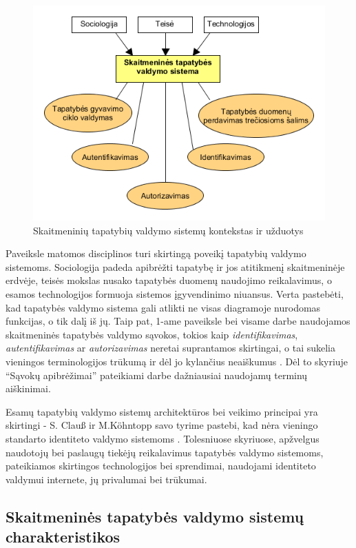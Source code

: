 \begin{figure}[H]
    \centering
    \includegraphics[scale=0.8]{img/IDMcontextAndUsecases}
    \caption{Skaitmeninių tapatybių valdymo sistemų kontekstas ir užduotys \cite{Glasser2009}}
\end{figure}

Paveiksle matomos disciplinos turi skirtingą poveikį tapatybių valdymo sistemoms. 
Sociologija padeda apibrėžti tapatybę ir jos atitikmenį skaitmeninėje erdvėje, teisės mokslas nusako tapatybės duomenų naudojimo reikalavimus,
o esamos technologijos formuoja sistemos įgyvendinimo niuansus. Verta pastebėti, kad tapatybės valdymo sistema gali atlikti ne visas
diagramoje nurodomas funkcijas, o tik dalį iš jų. Taip pat, 1-ame paveiksle bei visame darbe naudojamos skaitmeninės tapatybės valdymo sąvokos,
tokios kaip \textit{identifikavimas}, \textit{autentifikavimas} ar \textit{autorizavimas} neretai suprantamos skirtingai, o tai sukelia
vieningos terminologijos trūkumą ir dėl jo kylančius neaiškumus \cite{Glasser2009}. Dėl to skyriuje
\enquote{Sąvokų apibrėžimai} pateikiami darbe dažniausiai naudojamų terminų aiškinimai.

Esamų tapatybių valdymo sistemų architektūros bei veikimo principai yra skirtingi -  S. Clauß ir M.Köhntopp savo tyrime pastebi,
kad nėra vieningo standarto identiteto
valdymo sistemoms \cite{Claus2001}. Tolesniuose skyriuose, apžvelgus naudotojų bei paslaugų tiekėjų reikalavimus
tapatybės valdymo sistemoms, pateikiamos skirtingos technologijos
bei sprendimai, naudojami identiteto valdymui internete, jų privalumai bei trūkumai.

\subsection{Skaitmeninės tapatybės valdymo sistemų charakteristikos}

